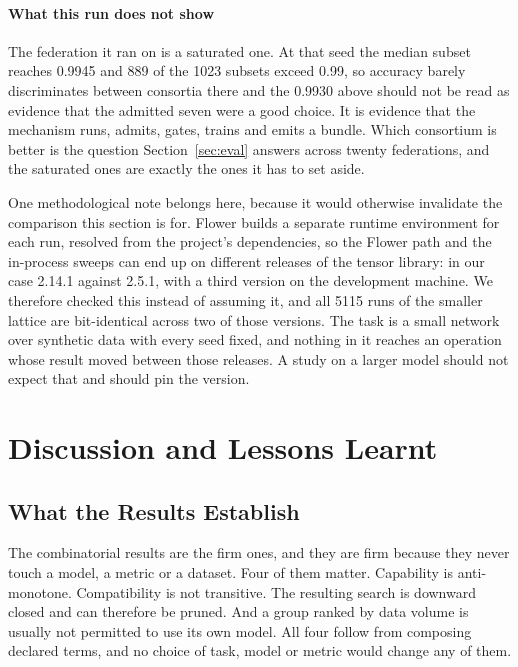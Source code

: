 \documentclass[10pt,conference]{IEEEtran}
\begin{document}
\paragraph{What this run does not show}
The federation it ran on is a saturated one. At that seed the median subset
reaches 0.9945 and 889 of the 1023 subsets exceed 0.99, so accuracy barely
discriminates between consortia there and the 0.9930 above should not be read
as evidence that the admitted seven were a good choice. It is evidence that the
mechanism runs, admits, gates, trains and emits a bundle. Which consortium is
better is the question Section~\ref{sec:eval} answers across twenty
federations, and the saturated ones are exactly the ones it has to set aside.

One methodological note belongs here, because it would otherwise invalidate the
comparison this section is for. Flower builds a separate runtime environment
for each run, resolved from the project's dependencies, so the Flower path and
the in-process sweeps can end up on different releases of the tensor library:
in our case 2.14.1 against 2.5.1, with a third version on the development
machine. We therefore checked this instead of assuming it, and all 5115 runs of the
smaller lattice are bit-identical across two of those versions. The task is a
small network over synthetic data with every seed fixed, and nothing in it
reaches an operation whose result moved between those releases. A study on a
larger model should not expect that and should pin the version.

\section{Discussion and Lessons Learnt}
\label{sec:discussion}

\subsection{What the Results Establish}

The combinatorial results are the firm ones, and they are firm because they
never touch a model, a metric or a dataset. Four of them matter. Capability is anti-monotone. Compatibility is not transitive. The resulting search is downward closed and can therefore be pruned. And a group ranked by data volume is usually not permitted to use its own model. All four follow from composing declared terms, and no choice of task, model or metric would change any of them.
\end{document}
